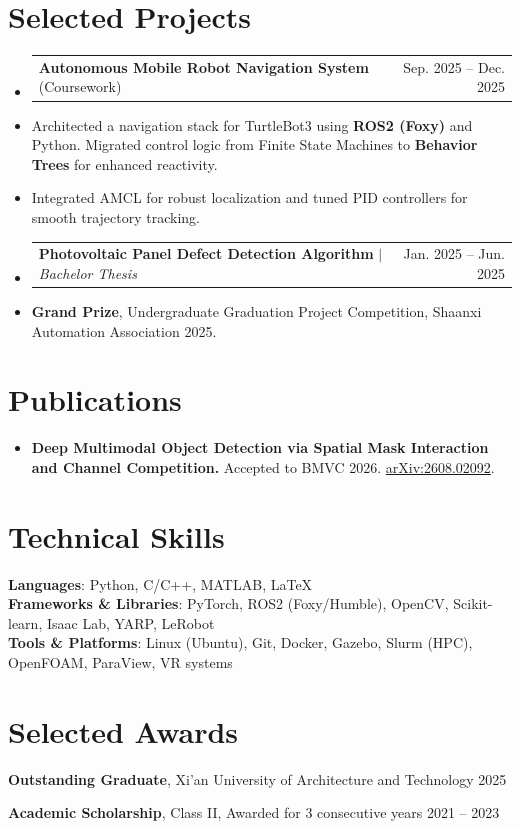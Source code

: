 \documentclass[11pt, letterpaper]{article}
\makeatletter
\newcommand{\resumeItem}[1]{
  \item\small{
    {#1 \vspace{-2pt}}
  }
}
\newcommand{\resumeProjectHeading}[2]{
    \Needspace{4\baselineskip}
    \item
    \begin{tabularx}{\linewidth}{@{}>{\raggedright\arraybackslash}Xr@{}}
      \small#1 & #2 \\
    \end{tabularx}\vspace{-5pt}
}
\makeatother
\begin{document}
\section{Selected Projects}
  \begin{itemize}[leftmargin=0.15in, label={}]
    \resumeProjectHeading
      {\textbf{Autonomous Mobile Robot Navigation System} (Coursework) }{Sep. 2025 -- Dec. 2025}
      \resumeItem{Architected a navigation stack for TurtleBot3 using \textbf{ROS2 (Foxy)} and Python. Migrated control logic from Finite State Machines to \textbf{Behavior Trees} for enhanced reactivity.}
     
      \resumeItem{Integrated AMCL for robust localization and tuned PID controllers for smooth trajectory tracking.}
    \resumeProjectHeading
      {\textbf{Photovoltaic Panel Defect Detection Algorithm} $|$ \emph{Bachelor Thesis}}{Jan. 2025 -- Jun. 2025}
      \resumeItem{\textbf{Grand Prize}, Undergraduate Graduation Project Competition, Shaanxi Automation Association \hfill 2025.
     }
    
  \end{itemize}
\section{Publications}
  \begin{itemize}[leftmargin=0.15in, label={}]
    \resumeItem{\textbf{Deep Multimodal Object Detection via Spatial Mask Interaction and Channel Competition.} Accepted to BMVC 2026. \href{https://arxiv.org/abs/2608.02092}{arXiv:2608.02092}.}
  \end{itemize}
\section{Technical Skills}
 \begin{itemize}[leftmargin=0.15in, label={}]
    \small{\item{
     \textbf{Languages}{: Python, C/C++, MATLAB, LaTeX} \\
     \textbf{Frameworks \& Libraries}{: PyTorch, ROS2 (Foxy/Humble), OpenCV, Scikit-learn, Isaac Lab, YARP, LeRobot} \\
     \textbf{Tools \& Platforms}{: Linux (Ubuntu), Git, Docker, Gazebo, Slurm (HPC), OpenFOAM, ParaView, VR systems}
  
    }}
 \end{itemize}
\section{Selected Awards}
 \begin{itemize}[leftmargin=0.15in, label={}]
    \small{
     \item{ \textbf{Outstanding Graduate}, Xi'an University of Architecture and Technology \hfill 2025}
    \item{
     \textbf{Academic Scholarship}, Class II, Awarded for 3 consecutive years \hfill 2021 -- 2023
    }}
   
    
 \end{itemize}
\end{document}
